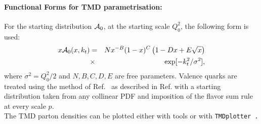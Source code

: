 \paragraph{Functional Forms for TMD parametrisation:} \rm

For the starting distribution ${\cal A}_0$, at the starting scale $Q_0^2$, 
the following form is used:
\begin{eqnarray}
x{\cal A}_0(x,\kt) &=& N x^{-B}(1 -x)^{C}\left(1 -D x 
+ E \sqrt{x}   \right) \nonumber\\
   &\times &\exp[ - k_t^2 / \sigma^2 ], 
\label{a0-5par}
\end{eqnarray}
where $ \sigma^2  =  Q_0^2 / 2 $ and $N, B, C, D, E$ are free parameters.
Valence quarks are treated using the method of Ref.~\cite{Deak:2010gk} as described 
in Ref. \cite{Hautmann:2013tba} with a starting distribution taken from any collinear PDF
and imposition of the flavor sum rule at every scale $p$.
\\
The TMD parton densities can be plotted either with \fitter tools 
or with \tt TMDplotter\rm~\cite{Hautmann:2014kza}.


